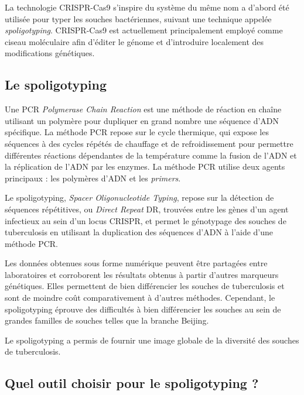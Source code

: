 \documentclass[twoside,a4paper,11pt,frenchb,openany]{report}
\begin{document}

La technologie CRISPR-Cas9 s'inspire du système du même nom a d'abord été utilisée pour typer les souches bactériennes, suivant une technique appelée \textit{spoligotyping}. CRISPR-Cas9 est actuellement principalement employé comme ciseau moléculaire afin d'éditer le génome et d'introduire localement des modifications génétiques.


\subsection{Le spoligotyping}

Une PCR \textit{Polymerase Chain Reaction} est une méthode de réaction en chaîne utilisant un polymère pour dupliquer en grand nombre une séquence d'ADN spécifique. La méthode PCR repose sur le cycle thermique, qui expose les séquences à des cycles répétés de chauffage et de refroidissement pour permettre différentes réactions dépendantes de la température comme la fusion de l'ADN et la réplication de l'ADN par les enzymes. La méthode PCR utilise deux agents principaux : les polymères d'ADN et les \textit{primers}.

Le spoligotyping, \textit{Spacer Oligonucleotide Typing}, repose sur la détection de séquences répétitives, ou \textit{Direct Repeat} DR, trouvées entre les gènes d'un agent infectieux au sein d'un locus CRISPR, et permet le génotypage des souches de tuberculosis en utilisant la duplication des séquences d'ADN à l'aide d'une méthode PCR.

Les données obtenues sous forme numérique peuvent être partagées entre laboratoires et corroborent les résultats obtenus à partir d'autres marqueurs génétiques. Elles permettent de bien différencier les souches de tuberculosis et sont de moindre coût comparativement à d'autres méthodes. Cependant, le spoligotyping éprouve des difficultés à bien différencier les souches au sein de grandes familles de souches telles que la branche Beijing.

Le spoligotyping a permis de fournir une image globale de la diversité des souches de tuberculosis.


\subsection{Quel outil choisir pour le spoligotyping ?}
\end{document}
